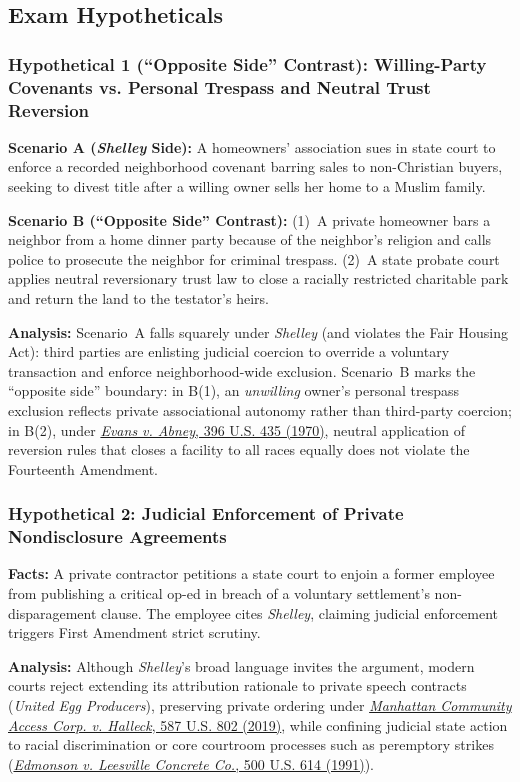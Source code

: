 \documentclass[12pt]{article}
\begin{document}
\subsection{Exam Hypotheticals}

\subsubsection{Hypothetical 1 (``Opposite Side'' Contrast): Willing-Party Covenants vs. Personal Trespass and Neutral Trust Reversion}
\textbf{Scenario A (\textit{Shelley} Side):} A homeowners' association sues in state court to enforce a recorded neighborhood covenant barring sales to non-Christian buyers, seeking to divest title after a willing owner sells her home to a Muslim family.

\textbf{Scenario B (``Opposite Side'' Contrast):} (1)~A private homeowner bars a neighbor from a home dinner party because of the neighbor's religion and calls police to prosecute the neighbor for criminal trespass. (2)~A state probate court applies neutral reversionary trust law to close a racially restricted charitable park and return the land to the testator's heirs.

\textbf{Analysis:} Scenario~A falls squarely under \textit{Shelley} (and violates the Fair Housing Act): third parties are enlisting judicial coercion to override a voluntary transaction and enforce neighborhood-wide exclusion. Scenario~B marks the ``opposite side'' boundary: in B(1), an \textit{unwilling} owner's personal trespass exclusion reflects private associational autonomy rather than third-party coercion; in B(2), under \href{https://supreme.justia.com/cases/federal/us/396/435/}{\textit{Evans v. Abney}, 396 U.S. 435 (1970)}, neutral application of reversion rules that closes a facility to all races equally does not violate the Fourteenth Amendment.

\subsubsection{Hypothetical 2: Judicial Enforcement of Private Nondisclosure Agreements}
\textbf{Facts:} A private contractor petitions a state court to enjoin a former employee from publishing a critical op-ed in breach of a voluntary settlement's non-disparagement clause. The employee cites \textit{Shelley}, claiming judicial enforcement triggers First Amendment strict scrutiny.

\textbf{Analysis:} Although \textit{Shelley}'s broad language invites the argument, modern courts reject extending its attribution rationale to private speech contracts (\textit{United Egg Producers}), preserving private ordering under \href{https://supreme.justia.com/cases/federal/us/587/17-1702/}{\textit{Manhattan Community Access Corp. v. Halleck}, 587 U.S. 802 (2019)}, while confining judicial state action to racial discrimination or core courtroom processes such as peremptory strikes (\href{https://supreme.justia.com/cases/federal/us/500/614/}{\textit{Edmonson v. Leesville Concrete Co.}, 500 U.S. 614 (1991)}).
\end{document}
